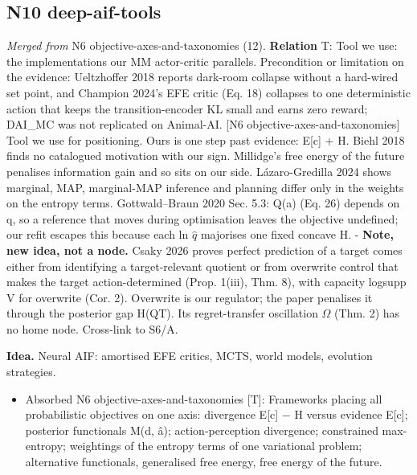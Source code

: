 \documentclass[10pt]{article}
\begin{document}
\subsection{N10 deep-aif-tools}\label{node:S3-N10-deep-aif-tools}
\textit{Merged from} N6 objective-axes-and-taxonomies (12). \textbf{Relation} \textsf{T}: Tool we use: the implementations our MM actor-critic parallels. Precondition or limitation on the evidence: Ueltzhoffer 2018 reports dark-room collapse without a hard-wired set point, and Champion 2024's EFE critic (Eq. 18) collapses to one deterministic action that keeps the transition-encoder KL small and earns zero reward; DAI\_MC was not replicated on Animal-AI. [N6 objective-axes-and-taxonomies] Tool we use for positioning. Ours is one step past evidence: E[c] + H. Biehl 2018 finds no catalogued motivation with our sign. Millidge's free energy of the future penalises information gain and so sits on our side. L\'azaro-Gredilla 2024 shows marginal, MAP, marginal-MAP inference and planning differ only in the weights on the entropy terms. Gottwald--Braun 2020 Sec. 5.3: Q(a) (Eq. 26) depends on q, so a reference that moves during optimisation leaves the objective undefined; our refit escapes this because each ln \ensuremath{\hat{q}} majorises one fixed concave H. - \textbf{Note, new idea, not a node.} Csaky 2026 proves perfect prediction of a target comes either from identifying a target-relevant quotient or from overwrite control that makes the target action-determined (Prop. 1(iii), Thm. 8), with capacity log\textbar{}supp V\textbar{} for overwrite (Cor. 2). Overwrite is our regulator; the paper penalises it through the posterior gap H(Q\textbar{}T). Its regret-transfer oscillation \ensuremath{\Omega} (Thm. 2) has no home node. Cross-link to S6/A.

\textbf{Idea.} Neural AIF: amortised EFE critics, MCTS, world models, evolution strategies.
\begin{itemize}[nosep,leftmargin=1.2em]
\item Absorbed N6 objective-axes-and-taxonomies [T]: Frameworks placing all probabilistic objectives on one axis: divergence E[c] \ensuremath{-} H versus evidence E[c]; posterior functionals M(d, \^a); action-perception divergence; constrained max-entropy; weightings of the entropy terms of one variational problem; alternative functionals, generalised free energy, free energy of the future.
\end{itemize}
\end{document}
